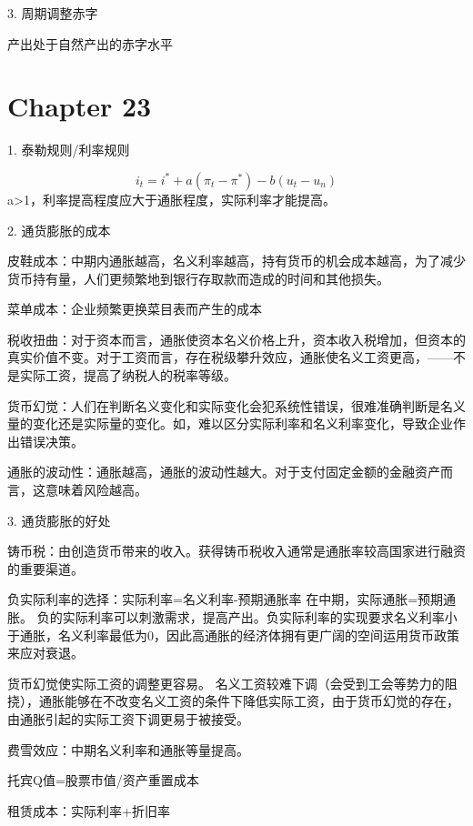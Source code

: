 \documentclass{article}
\begin{document}
\hspace*{\fill}

3. 周期调整赤字

产出处于自然产出的赤字水平

\section{Chapter 23}

1. 泰勒规则/利率规则

\[
i_t=i^*+a(\pi_t-\pi^*)-b(u_t-u_n)
\]
a>1，利率提高程度应大于通胀程度，实际利率才能提高。

\hspace*{\fill}

2. 通货膨胀的成本

皮鞋成本：中期内通胀越高，名义利率越高，持有货币的机会成本越高，为了减少货币持有量，人们更频繁地到银行存取款而造成的时间和其他损失。

菜单成本：企业频繁更换菜目表而产生的成本

税收扭曲：对于资本而言，通胀使资本名义价格上升，资本收入税增加，但资本的真实价值不变。对于工资而言，存在税级攀升效应，通胀使名义工资更高，——不是实际工资，提高了纳税人的税率等级。

货币幻觉：人们在判断名义变化和实际变化会犯系统性错误，很难准确判断是名义量的变化还是实际量的变化。如，难以区分实际利率和名义利率变化，导致企业作出错误决策。

通胀的波动性：通胀越高，通胀的波动性越大。对于支付固定金额的金融资产而言，这意味着风险越高。

3. 通货膨胀的好处

\hspace*{\fill}

铸币税：由创造货币带来的收入。获得铸币税收入通常是通胀率较高国家进行融资的重要渠道。

负实际利率的选择：实际利率=名义利率-预期通胀率
在中期，实际通胀=预期通胀。
负的实际利率可以刺激需求，提高产出。负实际利率的实现要求名义利率小于通胀，名义利率最低为0，因此高通胀的经济体拥有更广阔的空间运用货币政策来应对衰退。

货币幻觉使实际工资的调整更容易。
名义工资较难下调（会受到工会等势力的阻挠），通胀能够在不改变名义工资的条件下降低实际工资，由于货币幻觉的存在，由通胀引起的实际工资下调更易于被接受。


费雪效应：中期名义利率和通胀等量提高。

托宾Q值=股票市值/资产重置成本

租赁成本：实际利率+折旧率
\end{document}
